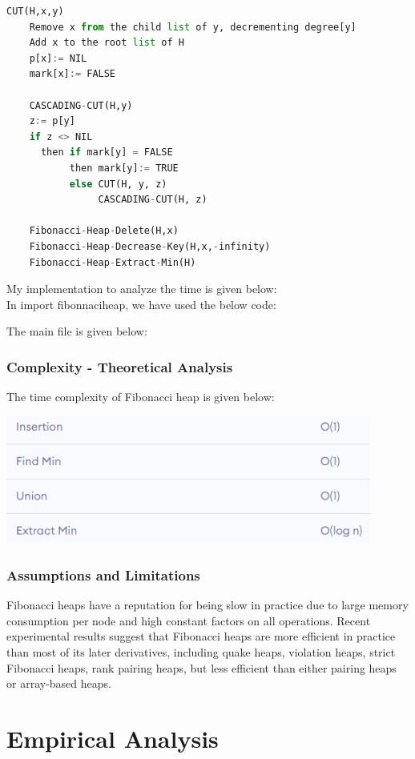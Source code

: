 \documentclass[a4paper, 12pt]{report}
\begin{document}
\begin{lstlisting}[language = Python]
    CUT(H,x,y)
    Remove x from the child list of y, decrementing degree[y]
    Add x to the root list of H
    p[x]:= NIL
    mark[x]:= FALSE
    
    CASCADING-CUT(H,y)
    z:= p[y]
    if z <> NIL
      then if mark[y] = FALSE
           then mark[y]:= TRUE
           else CUT(H, y, z)
                CASCADING-CUT(H, z)
    
    Fibonacci-Heap-Delete(H,x)
    Fibonacci-Heap-Decrease-Key(H,x,-infinity)
    Fibonacci-Heap-Extract-Min(H)
	\end{lstlisting}
	My implementation to analyze the time is given below:\\
	In import fibonnaciheap, we have used the below code:
	
	The main file is given below:
	
	\subsection{Complexity - Theoretical Analysis}
	The time complexity of Fibonacci heap is given below: 
	\begin{center}
	    \includegraphics[width=12cm]{images/fibonacci-Heap.PNG}
	\end{center}
	
	\subsection{Assumptions and Limitations}
	Fibonacci heaps have a reputation for being slow in practice due to large memory consumption per node and high constant factors on all operations. Recent experimental results suggest that Fibonacci heaps are more efficient in practice than most of its later derivatives, including quake heaps, violation heaps, strict Fibonacci heaps, rank pairing heaps, but less efficient than either pairing heaps or array-based heaps.
	
	\chapter{Empirical Analysis}
    
\end{document}
